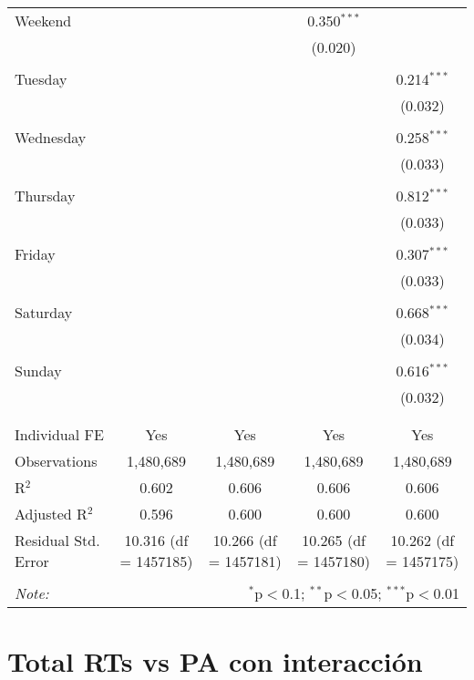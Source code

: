 \documentclass[
]{article}
\begin{document}
\begin{table}[!htbp]
{\begin{tabular}{@{\extracolsep{5pt}}lcccc}
 Weekend &  &  & 0.350$^{***}$ &  \\ 
  &  &  & (0.020) &  \\ 
  & & & & \\ 
 Tuesday &  &  &  & 0.214$^{***}$ \\ 
  &  &  &  & (0.032) \\ 
  & & & & \\ 
 Wednesday &  &  &  & 0.258$^{***}$ \\ 
  &  &  &  & (0.033) \\ 
  & & & & \\ 
 Thursday &  &  &  & 0.812$^{***}$ \\ 
  &  &  &  & (0.033) \\ 
  & & & & \\ 
 Friday &  &  &  & 0.307$^{***}$ \\ 
  &  &  &  & (0.033) \\ 
  & & & & \\ 
 Saturday &  &  &  & 0.668$^{***}$ \\ 
  &  &  &  & (0.034) \\ 
  & & & & \\ 
 Sunday &  &  &  & 0.616$^{***}$ \\ 
  &  &  &  & (0.032) \\ 
  & & & & \\ 
\hline \\[-1.8ex] 
Individual FE & Yes & Yes & Yes & Yes \\ 
Observations & 1,480,689 & 1,480,689 & 1,480,689 & 1,480,689 \\ 
R$^{2}$ & 0.602 & 0.606 & 0.606 & 0.606 \\ 
Adjusted R$^{2}$ & 0.596 & 0.600 & 0.600 & 0.600 \\ 
Residual Std. Error & 10.316 (df = 1457185) & 10.266 (df = 1457181) & 10.265 (df = 1457180) & 10.262 (df = 1457175) \\ 
\hline 
\hline \\[-1.8ex] 
\textit{Note:}  & \multicolumn{4}{r}{$^{*}$p$<$0.1; $^{**}$p$<$0.05; $^{***}$p$<$0.01} \\ 
\end{tabular}
} 
\end{table} 
\newpage
\section{Total RTs vs PA con interacción}
\end{document}
